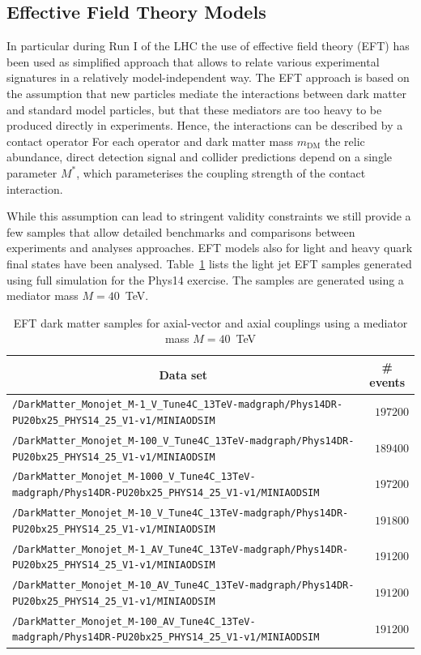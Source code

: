 \clearpage

\subsection{Effective Field Theory Models}


In particular during Run I of the LHC the use of effective field theory (EFT) has been used as simplified approach that allows to relate
various experimental signatures in a relatively model-independent way. The EFT approach is based on the assumption
that new particles mediate the interactions between dark matter and standard model particles, but that these mediators are too heavy to be produced directly in experiments. 
Hence, the interactions can be described by a contact operator For each operator and dark matter mass $m_\textrm{DM}$ the relic abundance, direct detection signal
 and collider predictions depend on a single parameter $M^*$, which parameterises the coupling strength of the contact interaction. 

While this assumption can lead to stringent validity constraints we still provide a few samples that allow detailed benchmarks and comparisons between experiments and analyses approaches.
EFT models also for light and heavy quark final states have been analysed.
Table~\ref{tab:datasets_dm} lists the light jet EFT samples generated using full simulation for the Phys14 exercise. The samples are generated using a mediator mass $M=40$~TeV.

\begin{table}
    \centering
    \caption{EFT dark matter samples for axial-vector and axial couplings using a mediator mass $M=40$~TeV \label{tab:datasets_dm}}
    \begin{tabular}{lr}
      \hline\hline
      \multicolumn{1}{c}{Data set}&\multicolumn{1}{c}{\# events}\tabularnewline
      \hline
      {\footnotesize \verb!/DarkMatter_Monojet_M-1_V_Tune4C_13TeV-madgraph/Phys14DR-PU20bx25_PHYS14_25_V1-v1/MINIAODSIM!   } &$197200$\tabularnewline
      {\footnotesize \verb!/DarkMatter_Monojet_M-100_V_Tune4C_13TeV-madgraph/Phys14DR-PU20bx25_PHYS14_25_V1-v1/MINIAODSIM! } &$189400$\tabularnewline
      {\footnotesize \verb!/DarkMatter_Monojet_M-1000_V_Tune4C_13TeV-madgraph/Phys14DR-PU20bx25_PHYS14_25_V1-v1/MINIAODSIM!} &$197200$\tabularnewline
      {\footnotesize \verb!/DarkMatter_Monojet_M-10_V_Tune4C_13TeV-madgraph/Phys14DR-PU20bx25_PHYS14_25_V1-v1/MINIAODSIM!  } &$191800$\tabularnewline
      {\footnotesize \verb!/DarkMatter_Monojet_M-1_AV_Tune4C_13TeV-madgraph/Phys14DR-PU20bx25_PHYS14_25_V1-v1/MINIAODSIM!  } &$191200$\tabularnewline
      {\footnotesize \verb!/DarkMatter_Monojet_M-10_AV_Tune4C_13TeV-madgraph/Phys14DR-PU20bx25_PHYS14_25_V1-v1/MINIAODSIM! } &$191200$\tabularnewline
      {\footnotesize \verb!/DarkMatter_Monojet_M-100_AV_Tune4C_13TeV-madgraph/Phys14DR-PU20bx25_PHYS14_25_V1-v1/MINIAODSIM!} &$191200$\tabularnewline
\hline
\end{tabular}
\end{table}


